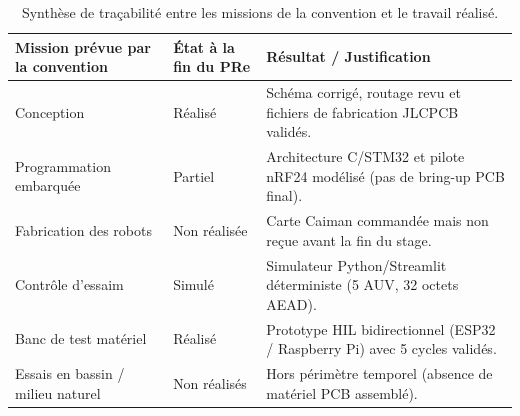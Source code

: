\begin{table}[htbp]
  \centering
  \small
  \caption{Synthèse de traçabilité entre les missions de la convention et le travail réalisé.}
  \label{tab:objectifs-convention}
  \begin{tabularx}{\textwidth}{@{}X l X@{}}
    \toprule
    \textbf{Mission prévue par la convention} & \textbf{État à la fin du PRe} & \textbf{Résultat / Justification} \\
    \midrule
    Conception & Réalisé & Schéma corrigé, routage revu et fichiers de fabrication JLCPCB validés. \\
    Programmation embarquée & Partiel & Architecture C/STM32 et pilote nRF24 modélisé (pas de bring-up PCB final). \\
    Fabrication des robots & Non réalisée & Carte Caiman commandée mais non reçue avant la fin du stage. \\
    Contrôle d'essaim & Simulé & Simulateur Python/Streamlit déterministe (5 AUV, 32 octets AEAD). \\
    Banc de test matériel & Réalisé & Prototype HIL bidirectionnel (ESP32 / Raspberry Pi) avec 5 cycles validés. \\
    Essais en bassin / milieu naturel & Non réalisés & Hors périmètre temporel (absence de matériel PCB assemblé). \\
    \bottomrule
  \end{tabularx}
\end{table}
